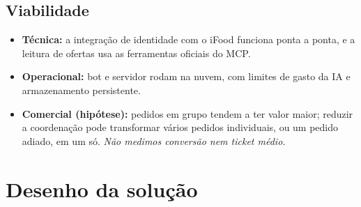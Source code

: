 \documentclass[11pt,a4paper]{article}
\begin{document}
\subsection{Viabilidade}
\begin{itemize}
  \item \textbf{Técnica:} a integração de identidade com o iFood funciona ponta a ponta, e a leitura de ofertas usa as ferramentas oficiais do MCP.
  \item \textbf{Operacional:} bot e servidor rodam na nuvem, com limites de gasto da IA e armazenamento persistente.
  \item \textbf{Comercial (hipótese):} pedidos em grupo tendem a ter valor maior; reduzir a coordenação pode transformar vários pedidos individuais, ou um pedido adiado, em um só. \emph{Não medimos conversão nem ticket médio.}
\end{itemize}

\section{Desenho da solução}
\end{document}
